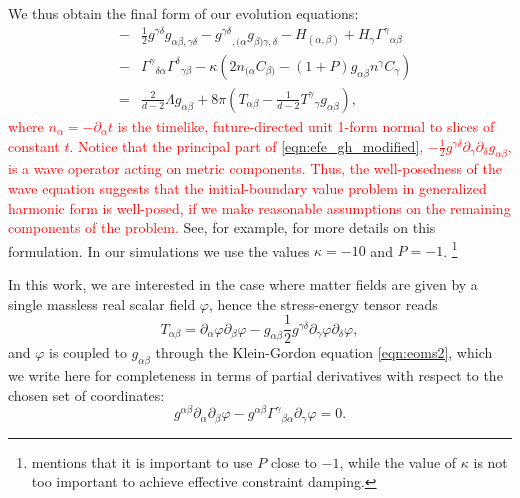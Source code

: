 \documentclass[a4paper,11pt]{article}
\numberwithin{equation}{section}
\begin{document}
We thus obtain the final form of our evolution equations:
\begin{eqnarray}
\label{eqn:efe_gh_modified}
&-& \frac{1}{2} g^{\gamma \delta} g_{\alpha\beta, \gamma \delta} - 
{g^{\gamma\delta}}_{,(\alpha} g_{\beta) \gamma, \delta} - H_{(\alpha, \beta)} + H_\gamma {\Gamma^\gamma}_{\alpha\beta} \nonumber \\
&-& {\Gamma^\gamma}_{\delta \alpha} {\Gamma^\delta}_{\gamma \beta} - \kappa \left( 2 n_{(\alpha} C_{\beta)} - (1+P) g_{\alpha\beta} n^\gamma 
C_\gamma \right) \nonumber \\
&=&  \frac{2}{d-2} \Lambda g_{\alpha\beta} + 8\pi \left( T_{\alpha\beta} - 
\frac{1}{d-2} {T^\gamma}_\gamma g_{\alpha\beta} \right),
\end{eqnarray}
\textcolor{red}{where $n_\alpha=-\partial_\alpha t$ is the timelike, future-directed unit 1-form normal to slices of constant $t$.
Notice that the principal part of \eqref{eqn:efe_gh_modified}, $-\frac{1}{2} g^{\gamma \delta} \partial_\gamma \partial_\delta g_{\alpha\beta}$, is a wave operator acting on metric components. Thus, the well-posedness of the wave equation suggests that the initial-boundary value problem in generalized harmonic form is well-posed, if we make reasonable assumptions on the remaining components of the problem.}
See, for example, \cite{Pretorius:2004jg,Bantilan:2012vu} for more details on this formulation. 
In our simulations we use the values $\kappa=-10$ and $P=-1$.
\footnote{\cite{Bantilan:2012vu} mentions that it is important to use $P$ close to $-1$, while the value of $\kappa$ is not too important to achieve effective constraint damping.}

In this work, we are interested in the case where matter fields are given by a single massless real scalar field $\varphi$, hence the stress-energy tensor reads
\begin{equation}
\label{eq:KHmomtens}
T_{\alpha\beta}=\partial_\alpha \varphi \partial_\beta \varphi - g_{\alpha\beta} \frac{1}{2} g^{\gamma\delta} \partial_{\gamma} \varphi \partial_{\delta} \varphi,
\end{equation}
and $\varphi$ is coupled to $g_{\alpha\beta}$ through the Klein-Gordon equation \eqref{eqn:eoms2}, which we write here for completeness in terms of partial derivatives with respect to the chosen set of coordinates:
\begin{equation}\label{eqn:eoms2cart}
g^{\alpha\beta} \partial_{\alpha} \partial_{\beta} \varphi -g^{\alpha\beta} \Gamma^{\gamma}{}_{\beta\alpha}\partial_\gamma\varphi= 0.
\end{equation}
\end{document}
